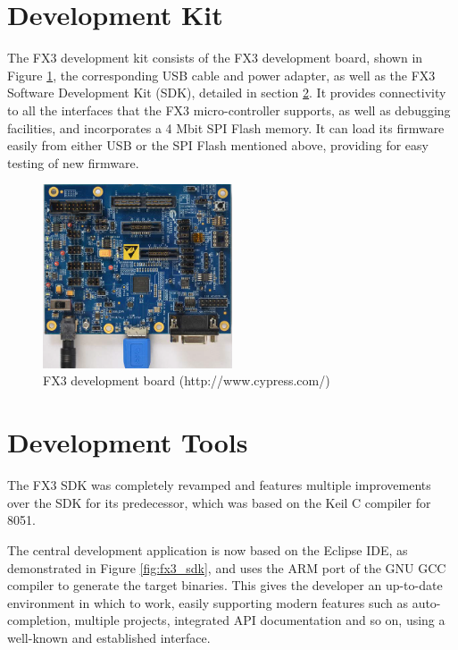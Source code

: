 \documentclass[a4paper,12pt]{report}
\begin{document}
\section{Development Kit} \label{sec:development_kit}

The FX3 development kit \cite{CYUSB3KIT-001} consists of the FX3 development board, shown in Figure \ref{fig:fx3_devboard}, the corresponding USB cable and power adapter, as well as the FX3 Software Development Kit (SDK), detailed in section \ref{sec:development_tools}.
It provides connectivity to all the interfaces that the FX3 micro-controller supports, as well as debugging facilities, and incorporates a 4 Mbit SPI Flash memory. It can load its firmware easily from either USB or the SPI Flash mentioned above, providing for easy testing of new firmware.

\begin{figure}[H]
\begin{center}
\includegraphics[width=0.5\textwidth]{fx3_devboard}
\caption{FX3 development board (http://www.cypress.com/)}
\label{fig:fx3_devboard}
\end{center}
\end{figure}

\section{Development Tools} \label{sec:development_tools}

The FX3 SDK was completely revamped and features multiple improvements over the SDK for its predecessor, which was based on the Keil C compiler for 8051.

The central development application is now based on the Eclipse IDE, as demonstrated in Figure \ref{fig:fx3_sdk}, and uses the ARM port of the GNU GCC compiler to generate the target binaries. This gives the developer an up-to-date environment in which to work, easily supporting modern features such as auto-completion, multiple projects, integrated API documentation and so on, using a well-known and established interface.
\end{document}
